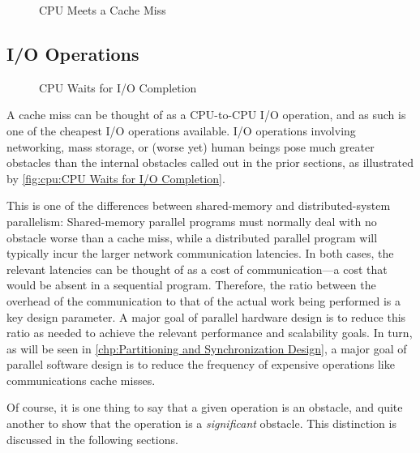 \QuickQuizEnd

\begin{figure}
\centering
{}
\caption{CPU Meets a Cache Miss}
\end{figure}

\subsection{I/O Operations}
\label{sec:cpu:I/O Operations}

\begin{figure}
\centering
{}
\caption{CPU Waits for I/O Completion}
\end{figure}

A cache miss can be thought of as a CPU-to-CPU I/O operation, and as
such is one of the cheapest I/O operations available.
I/O operations involving networking, mass storage, or (worse yet) human
beings pose much greater obstacles than the internal obstacles called
out in the prior sections,
as illustrated by
\cref{fig:cpu:CPU Waits for I/O Completion}.

This is one of the differences between shared-memory and distributed-system
parallelism:
Shared-memory parallel programs must normally deal with no
obstacle worse than a cache miss, while a distributed parallel program
will typically incur the larger network communication latencies.
In both cases, the relevant latencies can be thought of as a cost of
communication---a cost that would be absent in a sequential program.
Therefore, the ratio between the overhead of the communication to
that of the actual work being performed is a key design parameter.
A major goal of parallel hardware design is to reduce this ratio as
needed to achieve the relevant performance and scalability goals.
In turn, as will be seen in
\cref{chp:Partitioning and Synchronization Design},
a major goal of parallel software design is to reduce the
frequency of expensive operations like communications cache misses.

Of course, it is one thing to say that a given operation is an obstacle,
and quite another to show that the operation is a \emph{significant}
obstacle.
This distinction is discussed in the following sections.
